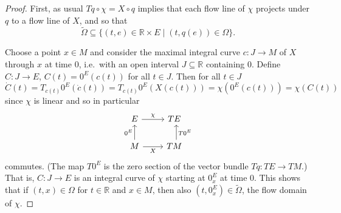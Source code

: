 \documentclass[10pt,a4paper]{amsart}
\begin{document}
\begin{proof}
First, as usual $Tq\circ \chi=X\circ q$ implies that each flow line of $\chi$ projects under $q$ to a flow line of $X$, and so that 
\[ \widetilde \Omega\subseteq \{(t, e)\in \mathbb R\times E\mid (t, q(e))\in \Omega\}.
\]

Choose a point $x\in M$ and consider the maximal integral curve $c\colon J\to M$ of $X$ through $x$ at time $0$, i.e.~with an open interval $J\subseteq \mathbb R$ containing $0$. Define $C\colon J\to E$, $C(t)=0^E(c(t))$ for all $t\in J$. Then  for all $t\in J$
\[ \dot C(t)=T_{c(t)}0^E(\dot c(t))=T_{c(t)}0^E(X(c(t)))=\chi(0^E(c(t)))=\chi(C(t))
\]
since $\chi$ is linear and so in particular 
\[\begin{tikzcd}
	E & TE \\
	M & TM
	\arrow["\chi", from=1-1, to=1-2]
	\arrow["{0^E}", from=2-1, to=1-1]
	\arrow["X"', from=2-1, to=2-2]
	\arrow["{T0^E}"', shift right, from=2-2, to=1-2]
\end{tikzcd}\]
commutes. (The map $T0^E$ is the zero section of the vector bundle $Tq\colon TE\to TM$.) That is, $C\colon J\to E$ is an integral curve of $\chi$ starting at $0^E_x$ at time $0$.
This shows that if $(t,x)\in \Omega$ for $t\in\mathbb R$ and $x\in M$, then also $(t,0^E_x)\in\widetilde \Omega$, the flow domain of $\chi$.



\end{proof}
\end{document}
